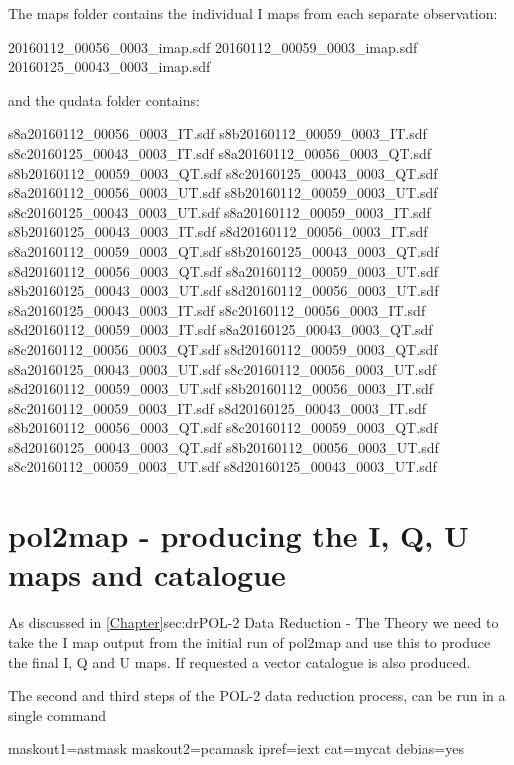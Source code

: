 The maps folder contains the individual I maps from each separate observation:

\begin{terminalv}
20160112_00056_0003_imap.sdf  20160112_00059_0003_imap.sdf  20160125_00043_0003_imap.sdf
\end{terminalv}

and the qudata folder contains:

\begin{terminalv}
s8a20160112_00056_0003_IT.sdf  s8b20160112_00059_0003_IT.sdf  s8c20160125_00043_0003_IT.sdf
s8a20160112_00056_0003_QT.sdf  s8b20160112_00059_0003_QT.sdf  s8c20160125_00043_0003_QT.sdf
s8a20160112_00056_0003_UT.sdf  s8b20160112_00059_0003_UT.sdf  s8c20160125_00043_0003_UT.sdf
s8a20160112_00059_0003_IT.sdf  s8b20160125_00043_0003_IT.sdf  s8d20160112_00056_0003_IT.sdf
s8a20160112_00059_0003_QT.sdf  s8b20160125_00043_0003_QT.sdf  s8d20160112_00056_0003_QT.sdf
s8a20160112_00059_0003_UT.sdf  s8b20160125_00043_0003_UT.sdf  s8d20160112_00056_0003_UT.sdf
s8a20160125_00043_0003_IT.sdf  s8c20160112_00056_0003_IT.sdf  s8d20160112_00059_0003_IT.sdf
s8a20160125_00043_0003_QT.sdf  s8c20160112_00056_0003_QT.sdf  s8d20160112_00059_0003_QT.sdf
s8a20160125_00043_0003_UT.sdf  s8c20160112_00056_0003_UT.sdf  s8d20160112_00059_0003_UT.sdf
s8b20160112_00056_0003_IT.sdf  s8c20160112_00059_0003_IT.sdf  s8d20160125_00043_0003_IT.sdf
s8b20160112_00056_0003_QT.sdf  s8c20160112_00059_0003_QT.sdf  s8d20160125_00043_0003_QT.sdf
s8b20160112_00056_0003_UT.sdf  s8c20160112_00059_0003_UT.sdf  s8d20160125_00043_0003_UT.sdf
\end{terminalv}


\section{pol2map - producing the I, Q, U maps and catalogue}


As discussed in \cref{Chapter}{sec:dr}{POL-2 Data Reduction - The Theory} we need to take the I map output from the initial run of pol2map 
and use this to produce the final I, Q and U maps. If requested a vector catalogue is also produced.

The second and third steps of the POL-2 data reduction process,  can be run in a single command

\begin{terminalv}
          maskout1=astmask maskout2=pcamask ipref=iext cat=mycat debias=yes
\end{terminalv}

